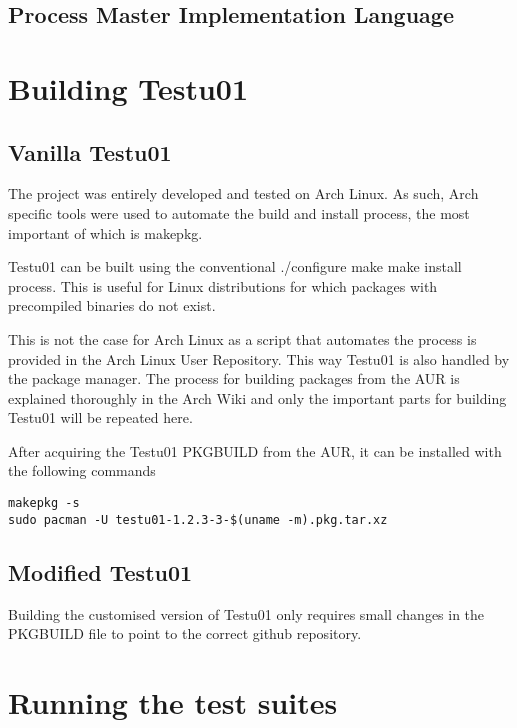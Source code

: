 \subsection{Process Master Implementation Language}


\section{Building Testu01}
\subsection{Vanilla Testu01}
The project was entirely developed and tested on Arch Linux. As such, Arch specific tools were used to automate the build and install process, the most important of which is makepkg.

Testu01 can be built using the conventional ./configure make make install process. This is useful for Linux distributions for which packages with precompiled binaries do not exist. 

This is not the case for Arch Linux as a script that automates the process is provided in the Arch Linux User Repository. This way Testu01 is also handled by the package manager. The process for building packages from the AUR is explained thoroughly in the Arch Wiki\cite{archwiki-aur} and only the important parts for building Testu01 will be repeated here.

After acquiring the Testu01 PKGBUILD from the AUR\cite{testu01-aur}, it can be installed with the following commands
\begin{verbatim}
makepkg -s
sudo pacman -U testu01-1.2.3-3-$(uname -m).pkg.tar.xz
\end{verbatim}

\subsection{Modified Testu01}
Building the customised version of Testu01 only requires small changes in the PKGBUILD file to point to the correct github repository.


\section{Running the test suites}
